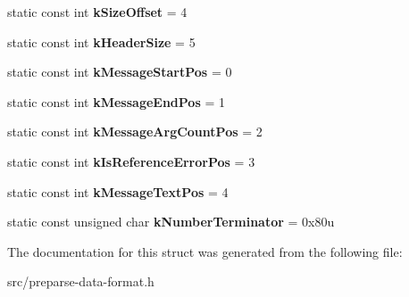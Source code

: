 \begin{DoxyCompactItemize}
\item 
\hypertarget{structv8_1_1internal_1_1_preparse_data_constants_ad3dedecab84154a319f67076a1dd8da6}{}static const int {\bfseries k\+Size\+Offset} = 4\label{structv8_1_1internal_1_1_preparse_data_constants_ad3dedecab84154a319f67076a1dd8da6}

\item 
\hypertarget{structv8_1_1internal_1_1_preparse_data_constants_a283e1dc7453162bb98007cca6e1654e0}{}static const int {\bfseries k\+Header\+Size} = 5\label{structv8_1_1internal_1_1_preparse_data_constants_a283e1dc7453162bb98007cca6e1654e0}

\item 
\hypertarget{structv8_1_1internal_1_1_preparse_data_constants_aa63c89425182c0e945ba74fd103472e3}{}static const int {\bfseries k\+Message\+Start\+Pos} = 0\label{structv8_1_1internal_1_1_preparse_data_constants_aa63c89425182c0e945ba74fd103472e3}

\item 
\hypertarget{structv8_1_1internal_1_1_preparse_data_constants_a492f166ee50324e0515db678c1489cc7}{}static const int {\bfseries k\+Message\+End\+Pos} = 1\label{structv8_1_1internal_1_1_preparse_data_constants_a492f166ee50324e0515db678c1489cc7}

\item 
\hypertarget{structv8_1_1internal_1_1_preparse_data_constants_af767699ba29647e0c763268d29dcbec3}{}static const int {\bfseries k\+Message\+Arg\+Count\+Pos} = 2\label{structv8_1_1internal_1_1_preparse_data_constants_af767699ba29647e0c763268d29dcbec3}

\item 
\hypertarget{structv8_1_1internal_1_1_preparse_data_constants_a90adfd96027826f87e60e7aa7d3793a1}{}static const int {\bfseries k\+Is\+Reference\+Error\+Pos} = 3\label{structv8_1_1internal_1_1_preparse_data_constants_a90adfd96027826f87e60e7aa7d3793a1}

\item 
\hypertarget{structv8_1_1internal_1_1_preparse_data_constants_afd4c3001d8e0acbb522b2dfb01b080a5}{}static const int {\bfseries k\+Message\+Text\+Pos} = 4\label{structv8_1_1internal_1_1_preparse_data_constants_afd4c3001d8e0acbb522b2dfb01b080a5}

\item 
\hypertarget{structv8_1_1internal_1_1_preparse_data_constants_abd7dac444caba692dbe79033ca6abcba}{}static const unsigned char {\bfseries k\+Number\+Terminator} = 0x80u\label{structv8_1_1internal_1_1_preparse_data_constants_abd7dac444caba692dbe79033ca6abcba}

\end{DoxyCompactItemize}


The documentation for this struct was generated from the following file\+:\begin{DoxyCompactItemize}
\item 
src/preparse-\/data-\/format.\+h\end{DoxyCompactItemize}
